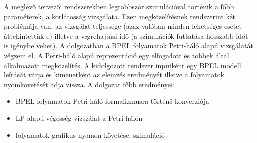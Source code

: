 A meglévő tervezői rendszerekben legtöbbször szimulációval történik a főbb paraméterek, a korlátosság vizsgálata. Ezen megközelítésnek rendszerint két problémája van: az vizsgálat teljessége (azaz valóban minden lehetséges esetet áttekintettük-e) illetve a végrehajtási idő (a szimulációk futtatása hosszabb időt is igénybe vehet).  A dolgozatban a BPEL folyamatok Petri-háló alapú vizsgálatát végzem el. A Petri-háló alapú reprezentáció egy elfogadott és többek által alkalmazott megközelítés. A kidolgozott rendszer inputként egy  BPEL modell leírását várja és kimenetként az elemzés eredményét illetve a folyamatok nyomkövetését  adja vissza. A dolgozat főbb eredményei:
\begin{itemize}
\item BPEL folyamatok Petri háló formalizmusra történő konverziója
\item LP alapú végesség vizsgálat a Petri hálón
\item folyamatok grafikus nyomon követése, szimuláció 
\end{itemize}

